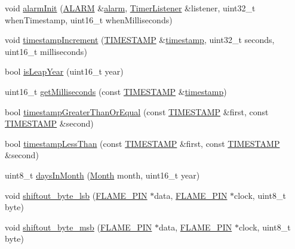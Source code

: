 \begin{DoxyCompactItemize}
\item 
void \hyperlink{namespaceflame_a2cd69d86c65ff8ba60e8750480a04959}{alarm\-Init} (\hyperlink{namespaceflame_a7a5a7b0bdd1b44d7d0b0a600552b5ab5}{A\-L\-A\-R\-M} \&\hyperlink{structflame_1_1alarm}{alarm}, \hyperlink{classflame_1_1_timer_listener}{Timer\-Listener} \&listener, uint32\-\_\-t when\-Timestamp, uint16\-\_\-t when\-Milliseconds)
\item 
void \hyperlink{namespaceflame_a2d8fea995ad2e8ec4282970472887f36}{timestamp\-Increment} (\hyperlink{namespaceflame_ad90347e9ea7e54907966260ec5c7d22f}{T\-I\-M\-E\-S\-T\-A\-M\-P} \&\hyperlink{structflame_1_1timestamp}{timestamp}, uint32\-\_\-t seconds, uint16\-\_\-t milliseconds)
\item 
bool \hyperlink{namespaceflame_ad423efa2ae6826bb7802a665749cc3e4}{is\-Leap\-Year} (uint16\-\_\-t year)
\item 
uint16\-\_\-t \hyperlink{namespaceflame_ae48cbbf3d65d1abcf15b069d39fa092a}{get\-Milliseconds} (const \hyperlink{namespaceflame_ad90347e9ea7e54907966260ec5c7d22f}{T\-I\-M\-E\-S\-T\-A\-M\-P} \&\hyperlink{structflame_1_1timestamp}{timestamp})
\item 
bool \hyperlink{namespaceflame_a746a6036383ae9b96f0bb1bf6772d0f8}{timestamp\-Greater\-Than\-Or\-Equal} (const \hyperlink{namespaceflame_ad90347e9ea7e54907966260ec5c7d22f}{T\-I\-M\-E\-S\-T\-A\-M\-P} \&first, const \hyperlink{namespaceflame_ad90347e9ea7e54907966260ec5c7d22f}{T\-I\-M\-E\-S\-T\-A\-M\-P} \&second)
\item 
bool \hyperlink{namespaceflame_a8bc729a78b5711171fd71a74cf9d3844}{timestamp\-Less\-Than} (const \hyperlink{namespaceflame_ad90347e9ea7e54907966260ec5c7d22f}{T\-I\-M\-E\-S\-T\-A\-M\-P} \&first, const \hyperlink{namespaceflame_ad90347e9ea7e54907966260ec5c7d22f}{T\-I\-M\-E\-S\-T\-A\-M\-P} \&second)
\item 
uint8\-\_\-t \hyperlink{namespaceflame_ab0d0aefa9aa7747b11fcc0f74e0af207}{days\-In\-Month} (\hyperlink{namespaceflame_aa452b7c1018de4dfa5d302b613109649}{Month} month, uint16\-\_\-t year)
\item 
void \hyperlink{namespaceflame_a7ef236223bc8c3d4e8e7f80a12f13be0}{shiftout\-\_\-byte\-\_\-lsb} (\hyperlink{namespaceflame_ae345f4de995f89125721dd4f5cd4cd9f}{F\-L\-A\-M\-E\-\_\-\-P\-I\-N} $\ast$data, \hyperlink{namespaceflame_ae345f4de995f89125721dd4f5cd4cd9f}{F\-L\-A\-M\-E\-\_\-\-P\-I\-N} $\ast$clock, uint8\-\_\-t byte)
\item 
void \hyperlink{namespaceflame_a2254ccc4f89cf8e81bc3f8a4715dad80}{shiftout\-\_\-byte\-\_\-msb} (\hyperlink{namespaceflame_ae345f4de995f89125721dd4f5cd4cd9f}{F\-L\-A\-M\-E\-\_\-\-P\-I\-N} $\ast$data, \hyperlink{namespaceflame_ae345f4de995f89125721dd4f5cd4cd9f}{F\-L\-A\-M\-E\-\_\-\-P\-I\-N} $\ast$clock, uint8\-\_\-t byte)

\end{DoxyCompactItemize}
